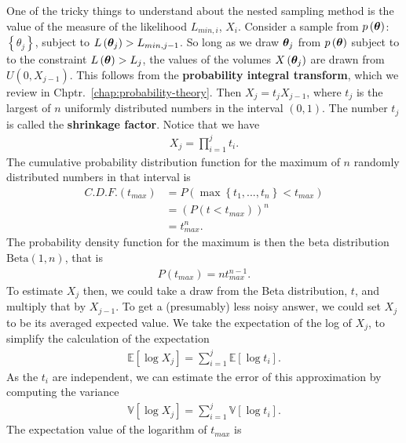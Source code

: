 One of the tricky things to understand about the nested sampling method is the value of the measure of the likelihood $L_{min,i}$, $X_i$.
Consider a sample from $p\left({\bm \theta}\right)$: $\left\{\theta_j\right\}$, subject to
$L\left({\bm \theta}_j\right)>L_{min,j-1}$. 
So long as we draw ${\bm \theta}_j$ from $p\left({\bm \theta}\right)$
subject to to the constraint $L\left({\bm \theta}\right)>L_j$,
the values of the volumes $X\left({\bm \theta}_j\right)$ are drawn from $U\left(0,X_{j-1}\right)$.
This follows from the \textbf{probability integral transform}, which we review
in Chptr.~\ref{chap:probability-theory}.
Then $X_j = t_j X_{j-1}$, where $t_j$ is the largest of $n$
uniformly distributed numbers in the interval $(0,1)$.
The number $t_j$ is called the \textbf{shrinkage factor}.
Notice that we have 
\begin{align}
    \label{eq:shrinkage-product}
    X_j = \prod_{i=1}^{j} t_i 
    .
\end{align}
The cumulative probability distribution function for the maximum of $n$ randomly
distributed numbers in that interval is
\begin{align}
    C.D.F.\left(t_{max}\right) 
    &=
    P\left(\max\left\{t_1,...,t_n\right\}<t_{max}\right)
    \nonumber\\
    &=
    \left(P\left(t<t_{max}\right)\right)^n
    \nonumber\\
    &=
    t_{max}^{n}
    .
\end{align}
The probability density function for the maximum is then the beta distribution 
$\mathrm{Beta}\left(1,n\right)$, that is
\begin{align}
    P\left(t_{max}\right) 
    =
    n t_{max}^{n-1}
    .
\end{align}
To estimate $X_j$ then, we could take a draw from the Beta distribution, $t$,
and multiply that by $X_{j-1}$.
To get a (presumably) less noisy answer, we could set $X_j$ to be its averaged
expected value.
We take the expectation of the log of $X_j$, to simplify the calculation of the expectation
\begin{align}
    \mathbb{E}\left[\log X_j\right]
    =
    \sum_{i=1}^j \mathbb{E}\left[\log t_i\right]
    .
\end{align}
As the $t_i$ are independent, we can estimate the error of this approximation by 
computing the variance
\begin{align}
    \mathbb{V}\left[\log X_j\right]
    =
    \sum_{i=1}^j \mathbb{V}\left[\log t_i\right]
    .
\end{align}
The expectation value of the logarithm of $t_{max}$ is
